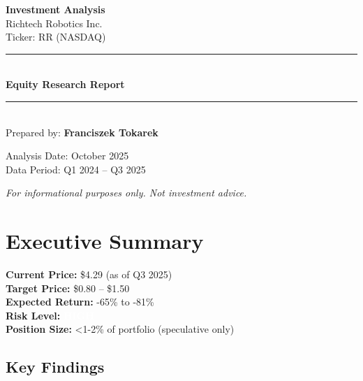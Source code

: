 \documentclass[11pt,a4paper]{article}
\begin{document}
\begin{titlepage}
    \centering
    \vspace*{2cm}
    
    {\Huge\bfseries Investment Analysis\\[0.5cm]}
    {\LARGE Richtech Robotics Inc.\\[0.3cm]}
    {\Large Ticker: RR (NASDAQ)\\[2cm]}
    
    \rule{\textwidth}{1.5pt}\\[0.5cm]
    {\Large\textbf{Equity Research Report}}\\[0.3cm]
    \rule{\textwidth}{1.5pt}\\[2cm]
    
    {\large Prepared by: \textbf{Franciszek Tokarek}\\[1cm]}
    
    {\large Analysis Date: October 2025\\[0.5cm]}
    {\large Data Period: Q1 2024 -- Q3 2025\\[2cm]}
    
    \vfill
    
    {\large\textit{For informational purposes only. Not investment advice.}}
\end{titlepage}

\newpage

\section*{Executive Summary}

\begin{tcolorbox}[colback=bearish!10, colframe=bearish!80, title=INVESTMENT RATING: PASS / HIGH RISK]
\textbf{Current Price:} \$4.29 (as of Q3 2025) \\
\textbf{Target Price:} \$0.80 -- \$1.50 \\
\textbf{Expected Return:} -65\% to -81\% \\
\textbf{Risk Level:} \colorbox{bearish}{\textcolor{white}{\textbf{HIGH}}} \\
\textbf{Position Size:} <1-2\% of portfolio (speculative only)
\end{tcolorbox}

\subsection*{Key Findings}
\end{document}
